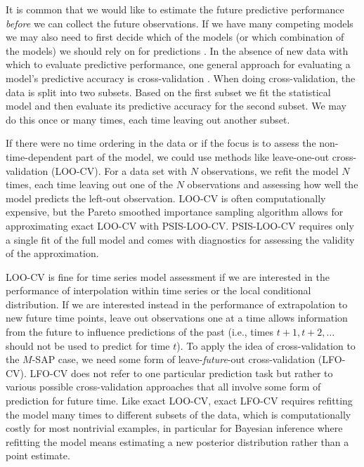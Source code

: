 \documentclass[american,]{article}
\begin{document}
It is common that we would like to estimate the future predictive performance \emph{before} we can collect the future observations.
If we have many competing models we may also need to
first decide which of the models (or which combination of the models) we should
rely on for predictions \citep{geisser1979, hoeting1999, vehtari2002, ando2010, vehtari2012}. In the absence of new data with which to evaluate predictive
performance, one general approach for evaluating a model's predictive accuracy
is cross-validation \citep{vehtari2002}. When doing cross-validation, the data is
split into two subsets. Based on the first subset we fit the statistical model
and then evaluate its predictive accuracy for the second subset. We may do this
once or many times, each time leaving out another subset.

If there were no time ordering in the data or if the focus is to assess the
non-time-dependent part of the model, we could use methods like leave-one-out
cross-validation (LOO-CV). For a data set with \(N\) observations, we refit the
model \(N\) times, each time leaving out one of the \(N\) observations and assessing
how well the model predicts the left-out observation. LOO-CV is often computationally
expensive, but the Pareto smoothed importance
sampling \citep[PSIS;][]{vehtari2017loo, vehtari2017psis} algorithm allows for
approximating exact LOO-CV with PSIS-LOO-CV. PSIS-LOO-CV requires only a single
fit of the full model and comes with diagnostics for assessing the validity of
the approximation.

LOO-CV is fine for time series model assessment if we are interested in the performance  of interpolation within time series or the local conditional distribution. If we are interested instead in the performance of extrapolation to new future time points, leave out observations one at a time allows information from the future to influence predictions of the
past (i.e., times \(t + 1, t+2, \ldots\) should not be used to predict for time
\(t\)). To apply the idea of cross-validation to the \(M\)-SAP case,  we need some form of leave-\emph{future}-out cross-validation (LFO-CV). LFO-CV
does not refer to one particular prediction task but rather to various possible
cross-validation approaches that all involve some form of prediction for future time. Like exact LOO-CV, exact LFO-CV requires refitting the model
many times to different subsets of the data, which is computationally
costly for most nontrivial examples, in particular for Bayesian inference where
refitting the model means estimating a new posterior distribution rather than a
point estimate.
\end{document}
